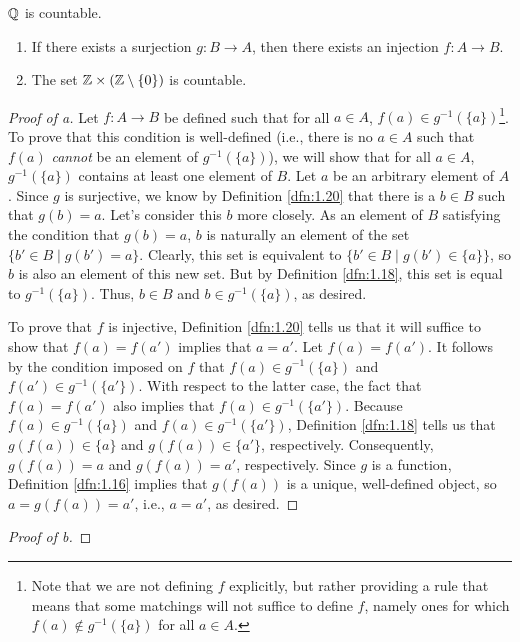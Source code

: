 \documentclass[../main.tex]{subfiles}
\begin{document}
\begin{theorem}\label{trm:2.11}
    $\mathbb{Q}$ is countable.
    \begin{lemma*}\leavevmode
        \begin{enumerate}[label={\alph*\textup{)}}]
            \item If there exists a surjection $g:B\to A$, then there exists an injection $f:A\to B$.
            \item The set $\mathbb{Z}\times(\mathbb{Z}\setminus\{0\})$ is countable.
        \end{enumerate}
        \begin{proof}[Proof of a]
            Let $f:A\to B$ be defined such that for all $a\in A$, $f(a)\in g^{-1}(\{a\})$\footnote{Note that we are not defining $f$ explicitly, but rather providing a rule that means that some matchings will not suffice to define $f$, namely ones for which $f(a)\notin g^{-1}(\{a\})$ for all $a\in A$.}. To prove that this condition is well-defined (i.e., there is no $a\in A$ such that $f(a)$ \emph{cannot} be an element of $g^{-1}(\{a\})$), we will show that for all $a\in A$, $g^{-1}(\{a\})$ contains at least one element of $B$. Let $a$ be an arbitrary element of $A$. Since $g$ is surjective, we know by Definition \ref{dfn:1.20} that there is a $b\in B$ such that $g(b)=a$. Let's consider this $b$ more closely. As an element of $B$ satisfying the condition that $g(b)=a$, $b$ is naturally an element of the set $\{b'\in B\mid g(b')=a\}$. Clearly, this set is equivalent to $\{b'\in B\mid g(b')\in\{a\}\}$, so $b$ is also an element of this new set. But by Definition \ref{dfn:1.18}, this set is equal to $g^{-1}(\{a\})$. Thus, $b\in B$ and $b\in g^{-1}(\{a\})$, as desired.\par
            To prove that $f$ is injective, Definition \ref{dfn:1.20} tells us that it will suffice to show that $f(a)=f(a')$ implies that $a=a'$. Let $f(a)=f(a')$. It follows by the condition imposed on $f$ that $f(a)\in g^{-1}(\{a\})$ and $f(a')\in g^{-1}(\{a'\})$. With respect to the latter case, the fact that $f(a)=f(a')$ also implies that $f(a)\in g^{-1}(\{a'\})$. Because $f(a)\in g^{-1}(\{a\})$ and $f(a)\in g^{-1}(\{a'\})$, Definition \ref{dfn:1.18} tells us that $g(f(a))\in\{a\}$ and $g(f(a))\in\{a'\}$, respectively. Consequently, $g(f(a))=a$ and $g(f(a))=a'$, respectively. Since $g$ is a function, Definition \ref{dfn:1.16} implies that $g(f(a))$ is a unique, well-defined object, so $a=g(f(a))=a'$, i.e., $a=a'$, as desired.
        \end{proof}
        \begin{proof}[Proof of b]

\end{proof}
\end{lemma*}
\end{theorem}
\end{document}
